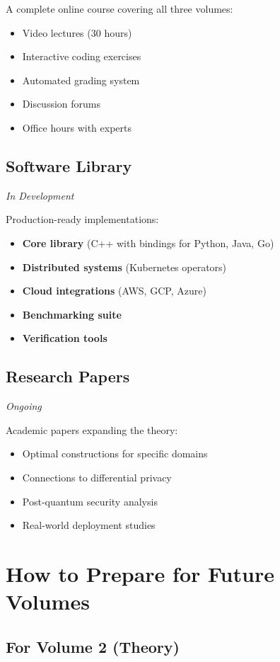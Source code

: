 A complete online course covering all three volumes:
\begin{itemize}
\item Video lectures (30 hours)
\item Interactive coding exercises
\item Automated grading system
\item Discussion forums
\item Office hours with experts
\end{itemize}

\subsection{Software Library}
\textit{In Development}

Production-ready implementations:
\begin{itemize}
\item \textbf{Core library} (C++ with bindings for Python, Java, Go)
\item \textbf{Distributed systems} (Kubernetes operators)
\item \textbf{Cloud integrations} (AWS, GCP, Azure)
\item \textbf{Benchmarking suite}
\item \textbf{Verification tools}
\end{itemize}

\subsection{Research Papers}
\textit{Ongoing}

Academic papers expanding the theory:
\begin{itemize}
\item Optimal constructions for specific domains
\item Connections to differential privacy
\item Post-quantum security analysis
\item Real-world deployment studies
\end{itemize}

\section{How to Prepare for Future Volumes}

\subsection{For Volume 2 (Theory)}

